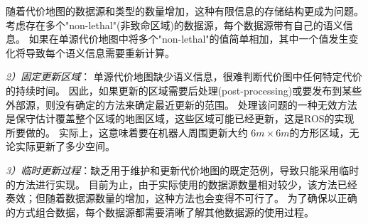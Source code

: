 随着代价地图的数据源和类型的数量增加，这种有限信息的存储结构更成为问题。
考虑存在多个"non-lethal"(非致命区域)的数据源，每个数据源带有自己的语义信息。
如果在单源代价地图中将多个"non-lethal"的值简单相加，其中一个值发生变化将导致每个语义信息需要重新计算。



\emph{\color{blue}2）固定更新区域}：
单源代价地图缺少语义信息，很难判断代价图中任何特定代价的持续时间。 因此，如果更新的区域需要后处理(post-processing)或要发布到某些外部源，则没有确定的方法来确定最近更新的范围。 处理该问题的一种无效方法是保守估计覆盖整个区域的地图区域，这些区域可能已经更新，这是ROS的实现所要做的。 实际上，这意味着要在机器人周围更新大约 $6m \times 6m$的方形区域，无论实际更新了多少空间。



\emph{\color{blue}3）临时更新过程}：缺乏用于维护和更新代价地图的既定范例，导致只能采用临时的方法进行实现。 目前为止，由于实际使用的数据源数量相对较少，该方法已经奏效；但随着数据源数量的增加，这种方法也会变得不可行了。 为了确保以正确的方式组合数据，每个数据源都需要清晰了解其他数据源的使用过程。

